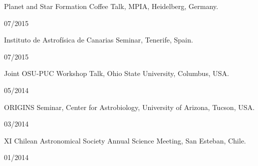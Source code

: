 \documentclass[12pt, a4paper]{article} %
\begin{document}
\begin{minipage}[t]{0.7\textwidth}
\begin{flushleft}%
  \setlength{\leftskip}{0.2cm}%
Planet and Star Formation Coffee Talk, MPIA,  Heidelberg, Germany.
\end{flushleft}
\end{minipage}
\begin{minipage}[t]{0.3\textwidth}
\hfill 07/2015
\end{minipage}

\begin{minipage}[t]{0.7\textwidth}
\begin{flushleft}%
  \setlength{\leftskip}{0.2cm}%
Instituto de Astrof\'isica de Canarias Seminar, Tenerife, Spain.
\end{flushleft}
\end{minipage}
\begin{minipage}[t]{0.3\textwidth}
\hfill 07/2015
\end{minipage}
\begin{minipage}[t]{0.7\textwidth}
\begin{flushleft}%
  \setlength{\leftskip}{0.2cm}%
Joint OSU-PUC Workshop Talk, Ohio State University, Columbus, USA.
\end{flushleft}
\end{minipage}
\begin{minipage}[t]{0.3\textwidth}
\hfill 05/2014
\end{minipage}

\begin{minipage}[t]{0.7\textwidth}
\begin{flushleft}%
  \setlength{\leftskip}{0.2cm}%
ORIGINS Seminar, Center for Astrobiology, University of Arizona, Tucson, USA.
\end{flushleft}
\end{minipage}
\begin{minipage}[t]{0.3\textwidth}
\hfill 03/2014
\end{minipage}

\begin{minipage}[t]{0.7\textwidth}
\begin{flushleft}%
  \setlength{\leftskip}{0.2cm}%
XI Chilean Astronomical Society Annual Science Meeting, San Esteban, Chile.
\end{flushleft}
\end{minipage}
\begin{minipage}[t]{0.3\textwidth}
\hfill 01/2014
\end{minipage}
\end{document}
